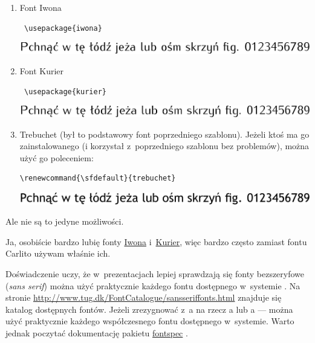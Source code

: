 \begin{frame}
\begin{enumerate}
  \item Font Iwona
        \begin{lstlisting}
 \usepackage{iwona}
\end{lstlisting}
        \includegraphics[width=.8\textwidth]{iwona}
  \item Font Kurier
        \begin{lstlisting}
 \usepackage{kurier}
\end{lstlisting}
        \includegraphics[width=.8\textwidth]{kurier}
  \item Trebuchet (był to podstawowy font poprzedniego szablonu).
        Jeżeli ktoś ma go zainstalowanego (i korzystał z~poprzedniego szablonu bez problemów), można użyć go poleceniem:
        \begin{lstlisting}
\renewcommand{\sfdefault}{trebuchet}
\end{lstlisting}
        \includegraphics[width=.8\textwidth]{trebuchet}
 \end{enumerate}
 Ale nie są to jedyne możliwości.
\end{frame}

Ja, osobiście bardzo lubię fonty \href{https://www.ctan.org/pkg/iwona}{Iwona} i~\href{https://www.ctan.org/pkg/kurier}{Kurier}, więc bardzo często zamiast fontu Carlito używam właśnie ich.

Doświadczenie uczy, że w~prezentacjach lepiej sprawdzają się fonty bezszeryfowe (\emph{sans serif}) można użyć praktycznie każdego fontu dostępnego w~systemie . Na stronie \url{http://www.tug.dk/FontCatalogue/sansseriffonts.html} znajduje się katalog dostępnych fontów. Jeżeli zrezygnować z~a na rzecz a lub a — można użyć praktycznie każdego współczesnego fontu dostępnego w~systemie. Warto jednak poczytać dokumentację pakietu \href{https://ctan.org/pkg/fontspec}{fontspec} \cite{Fontspec}.


